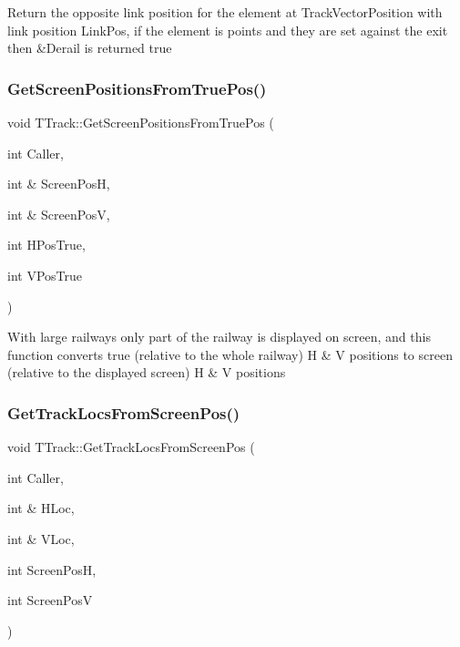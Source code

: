 Return the opposite link position for the element at Track\+Vector\+Position with link position Link\+Pos, if the element is points and they are set against the exit then \&Derail is returned true \mbox{\label{class_t_track_abda5d1209d5a197f1cefb851f567736d}} 
\subsubsection{\texorpdfstring{Get\+Screen\+Positions\+From\+True\+Pos()}{GetScreenPositionsFromTruePos()}}
{\footnotesize\ttfamily void T\+Track\+::\+Get\+Screen\+Positions\+From\+True\+Pos (\begin{DoxyParamCaption}\item[{int}]{Caller,  }\item[{int \&}]{Screen\+PosH,  }\item[{int \&}]{Screen\+PosV,  }\item[{int}]{H\+Pos\+True,  }\item[{int}]{V\+Pos\+True }\end{DoxyParamCaption})}

With large railways only part of the railway is displayed on screen, and this function converts true (relative to the whole railway) H \& V positions to screen (relative to the displayed screen) H \& V positions \mbox{\label{class_t_track_ac57ebd0462a3e0d8323e7b5cbc0e20ca}} 
\subsubsection{\texorpdfstring{Get\+Track\+Locs\+From\+Screen\+Pos()}{GetTrackLocsFromScreenPos()}}
{\footnotesize\ttfamily void T\+Track\+::\+Get\+Track\+Locs\+From\+Screen\+Pos (\begin{DoxyParamCaption}\item[{int}]{Caller,  }\item[{int \&}]{H\+Loc,  }\item[{int \&}]{V\+Loc,  }\item[{int}]{Screen\+PosH,  }\item[{int}]{Screen\+PosV }\end{DoxyParamCaption})}

